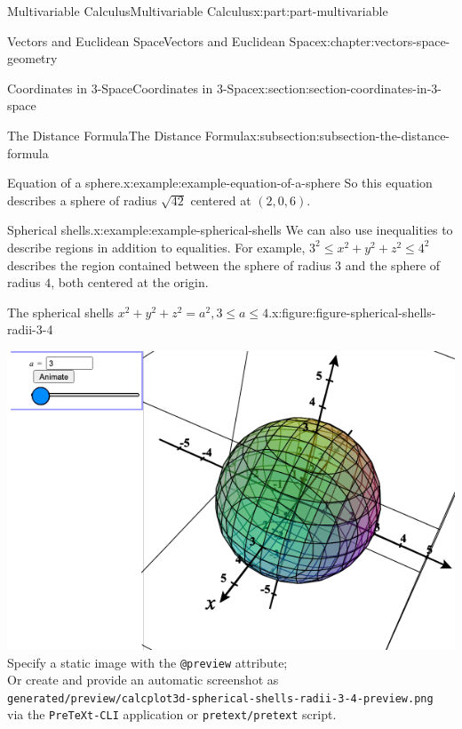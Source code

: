 \documentclass[twoside,10pt,]{book}
\newcommand{\mono}[1]{\texttt{#1}}
\numberwithin{equation}{part}
\newlength{\qrsize}
\newlength{\previewwidth}
\begin{document}
\begin{partptx}{Multivariable Calculus}{}{Multivariable Calculus}{}{}{x:part:part-multivariable}
\begin{chapterptx}{Vectors and Euclidean Space}{}{Vectors and Euclidean Space}{}{}{x:chapter:vectors-space-geometry}
\begin{sectionptx}{Coordinates in 3-Space}{}{Coordinates in 3-Space}{}{}{x:section:section-coordinates-in-3-space}
\begin{subsectionptx}{The Distance Formula}{}{The Distance Formula}{}{}{x:subsection:subsection-the-distance-formula}
\begin{example}{Equation of a sphere.}{x:example:example-equation-of-a-sphere}
So this equation describes a sphere of radius \(\sqrt{42}\) centered at \((2,0,6)\).%
\end{example}
\begin{example}{Spherical shells.}{x:example:example-spherical-shells}%
We can also use inequalities to describe regions in addition to equalities. For example, \(3^2\leq x^{2}+y^{2}+z^{2}\leq 4^2\) describes the region contained between the sphere of radius \(3\) and the sphere of radius \(4\), both centered at the origin.%
\end{example}
\begin{figureptx}{The spherical shells \(x^2 + y^2 + z^2 = a^2, 3\leq a\leq 4\).}{x:figure:figure-spherical-shells-radii-3-4}{}%
\centering
\setlength{\qrsize}{9em}
\setlength{\previewwidth}{\linewidth}
\addtolength{\previewwidth}{-\qrsize}
\begin{tcbraster}[raster columns=2, raster column skip=1pt, raster halign=center, raster force size=false, raster left skip=0pt, raster right skip=0pt]%
\begin{tcolorbox}[previewstyle, width=\previewwidth]%
%
{\includegraphics[width=0.80\linewidth,height=\qrsize,keepaspectratio]{generated/preview/calcplot3d-spherical-shells-radii-3-4-preview.png}}%
{\small{}Specify a static image with the \mono{@preview} attribute;\\%
Or create and provide an automatic screenshot as\\%
\mono{generated/preview/calcplot3d-spherical-shells-radii-3-4-preview.png}\\%
via the \mono{PreTeXt-CLI} application or \mono{pretext/pretext} script.}%
\end{tcolorbox}%
\begin{tcolorbox}[qrstyle]%
{\hypersetup{urlcolor=black}}%

\end{tcolorbox}
\end{tcbraster}
\end{figureptx}
\end{subsectionptx}
\end{sectionptx}
\end{chapterptx}
\end{partptx}
\end{document}
